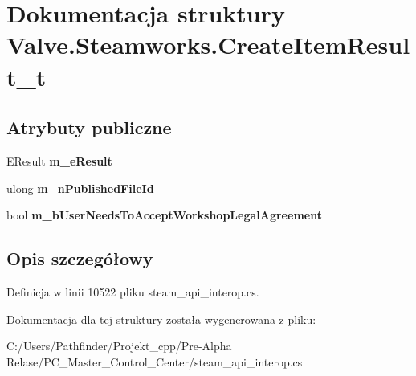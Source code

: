 \hypertarget{struct_valve_1_1_steamworks_1_1_create_item_result__t}{}\section{Dokumentacja struktury Valve.\+Steamworks.\+Create\+Item\+Result\+\_\+t}
\label{struct_valve_1_1_steamworks_1_1_create_item_result__t}
\subsection*{Atrybuty publiczne}
\begin{DoxyCompactItemize}
\item 
\mbox{\label{struct_valve_1_1_steamworks_1_1_create_item_result__t_a2933b17d3f355418f85117085c46a940}} 
E\+Result {\bfseries m\+\_\+e\+Result}
\item 
\mbox{\label{struct_valve_1_1_steamworks_1_1_create_item_result__t_a334bcec8fc359b6a79906049bc2c665b}} 
ulong {\bfseries m\+\_\+n\+Published\+File\+Id}
\item 
\mbox{\label{struct_valve_1_1_steamworks_1_1_create_item_result__t_a149d669043fa084f52d8d65a6291103b}} 
bool {\bfseries m\+\_\+b\+User\+Needs\+To\+Accept\+Workshop\+Legal\+Agreement}
\end{DoxyCompactItemize}


\subsection{Opis szczegółowy}


Definicja w linii 10522 pliku steam\+\_\+api\+\_\+interop.\+cs.



Dokumentacja dla tej struktury została wygenerowana z pliku\+:\begin{DoxyCompactItemize}
\item 
C\+:/\+Users/\+Pathfinder/\+Projekt\+\_\+cpp/\+Pre-\/\+Alpha Relase/\+P\+C\+\_\+\+Master\+\_\+\+Control\+\_\+\+Center/steam\+\_\+api\+\_\+interop.\+cs\end{DoxyCompactItemize}
